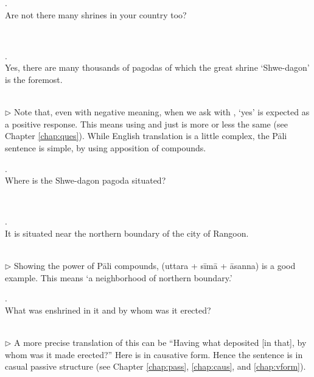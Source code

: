 \medskip
\parbox[lt]{0.93\linewidth}{\raggedright{}. \\
\hspace*{6mm}Are not there many shrines in your country too?}\\[1mm]

\medskip
\parbox[lt]{0.93\linewidth}{\raggedright{}. \\
\hspace*{6mm}Yes, there are many thousands of pagodas of which the great shrine `Shwe-dagon' is the foremost.}\\[1mm]
{\small $\triangleright$ Note that, even with negative meaning, when we ask with , `yes' is expected as a positive response. This means using  and just  is more or less the same (see Chapter \ref{chap:ques}). While English translation is a little complex, the P\=ali sentence is simple, by using apposition of compounds.}

\medskip
\parbox[lt]{0.93\linewidth}{\raggedright{}. \\
\hspace*{6mm}Where is the Shwe-dagon pagoda situated?}\\[1mm]

\medskip
\parbox[lt]{0.93\linewidth}{\raggedright{}. \\
\hspace*{6mm}It is situated near the northern boundary of the city of Rangoon.}\\[1mm]
{\small $\triangleright$ Showing the power of P\=ali compounds,  (uttara + s\=im\=a + \=asanna) is a good example. This means `a neighborhood of northern boundary.'}

\medskip
\parbox[lt]{0.93\linewidth}{\raggedright{}. \\
\hspace*{6mm}What was enshrined in it and by whom was it erected?}\\[1mm]
{\small $\triangleright$ A more precise translation of this can be ``Having what deposited [in that], by whom was it made erected?'' Here  is in causative form. Hence the sentence is in casual passive structure (see Chapter \ref{chap:pass}, \ref{chap:caus}, and \ref{chap:vform}).}


